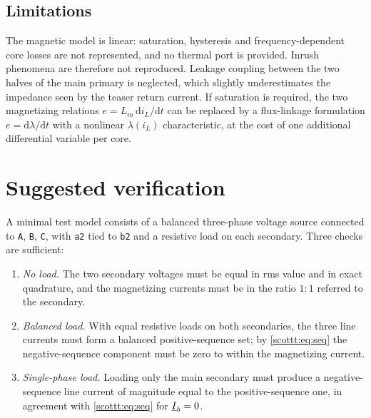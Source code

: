 \subsection{Limitations}

The magnetic model is linear: saturation, hysteresis and frequency-dependent
core losses are not represented, and no thermal port is provided. Inrush
phenomena are therefore not reproduced. Leakage coupling between the two halves
of the main primary is neglected, which slightly underestimates the impedance
seen by the teaser return current. If saturation is required, the two
magnetizing relations $e = L_m\,\mathrm{d}i_L/\mathrm{d}t$ can be replaced by a
flux-linkage formulation $e = \mathrm{d}\lambda/\mathrm{d}t$ with a nonlinear
$\lambda(i_L)$ characteristic, at the cost of one additional differential
variable per core.

\section{Suggested verification}

A minimal test model consists of a balanced three-phase voltage source
connected to \texttt{A}, \texttt{B}, \texttt{C}, with \texttt{a2} tied to
\texttt{b2} and a resistive load on each secondary. Three checks are
sufficient:
\begin{enumerate}
\item \emph{No load.} The two secondary voltages must be equal in rms value and
in exact quadrature, and the magnetizing currents must be in the ratio
$1:1$ referred to the secondary.
\item \emph{Balanced load.} With equal resistive loads on both secondaries, the
three line currents must form a balanced positive-sequence set; by
\eqref{scottt:eq:seq} the negative-sequence component must be zero to within the
magnetizing current.
\item \emph{Single-phase load.} Loading only the main secondary must produce a
negative-sequence line current of magnitude equal to the positive-sequence one,
in agreement with \eqref{scottt:eq:seq} for $\underline{I}_b = 0$.
\end{enumerate}

